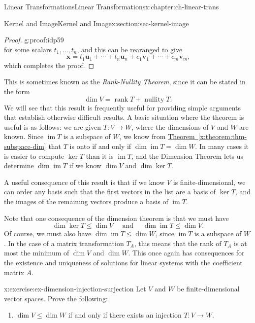 \documentclass[oneside,10pt,]{book}
\newcommand{\xreffont}{\relax}
\numberwithin{equation}{section}
\newcommand{\im}{\operatorname{im}}
\newcommand{\rank}{\operatorname{rank}}
\newcommand{\uu}{\mathbf{u}}
\newcommand{\vv}{\mathbf{v}}
\newcommand{\xx}{\mathbf{x}}
\begin{document}
\begin{chapterptx}{Linear Transformations}{}{Linear Transformations}{}{}{x:chapter:ch-linear-trans}
\begin{sectionptx}{Kernel and Image}{}{Kernel and Image}{}{}{x:section:sec-kernel-image}
\begin{proof}{}{g:proof:idp59}
\begin{equation*}
\end{equation*}
for some scalars \(t_1,\ldots, t_n\), and this can be rearanged to give%
\begin{equation*}
\xx=t_1\uu_1+\cdots +t_n\uu_n+c_1\vv_1+\cdots + c_m\vv_m\text{,}
\end{equation*}
which completes the proof.%
\end{proof}
This is sometimes known as the \emph{Rank-Nullity Theorem}, since it can be stated in the form%
\begin{equation*}
\dim V = \rank T + \operatorname{nullity} T\text{.}
\end{equation*}
We will see that this result is frequently useful for providing simple arguments that establish otherwise difficult results. A basic situation where the theorem is useful is as follows: we are given \(T:V\to W\), where the dimensions of \(V\) and \(W\) are known. Since \(\im T\) is a subspace of \(W\), we know from \hyperref[x:theorem:thm-subspace-dim]{Theorem~{\xreffont\ref{x:theorem:thm-subspace-dim}}} that \(T\) is onto if and only if \(\dim \im T = \dim W\). In many cases it is easier to compute \(\ker T\) than it is \(\im T\), and the Dimension Theorem lets us determine \(\dim\im T\) if we know \(\dim V\) and \(\dim \ker T\).%
\par
A useful consequence of this result is that if we know \(V\) is finite-dimensional, we can order any basis such that the first vectors in the list are a basis of \(\ker T\), and the images of the remaining vectors produce a basis of \(\im T\).%
\par
Note that one consequence of the dimension theorem is that we must have%
\begin{equation*}
\dim \ker T\leq \dim V \quad \text{ and } \quad \dim \im T\leq \dim V\text{.}
\end{equation*}
Of course, we must also have \(\dim\im T\leq \dim W\), since \(\im T\) is a subspace of \(W\). In the case of a matrix transformation \(T_A\), this means that the rank of \(T_A\) is at most the minimum of \(\dim V\) and \(\dim W\). This once again has consequences for the existence and uniqueness of solutions for linear systems with the coefficient matrix \(A\).%
\begin{inlineexercise}{}{x:exercise:ex-dimension-injection-surjection}%
Let \(V\) and \(W\) be finite-dimensional vector spaces. Prove the following:%
\begin{enumerate}
\item{}\(\dim V\leq \dim W\) if and only if there exists an injection \(T:V\to W\).%

\end{enumerate}
\end{inlineexercise}
\end{sectionptx}
\end{chapterptx}
\end{document}
